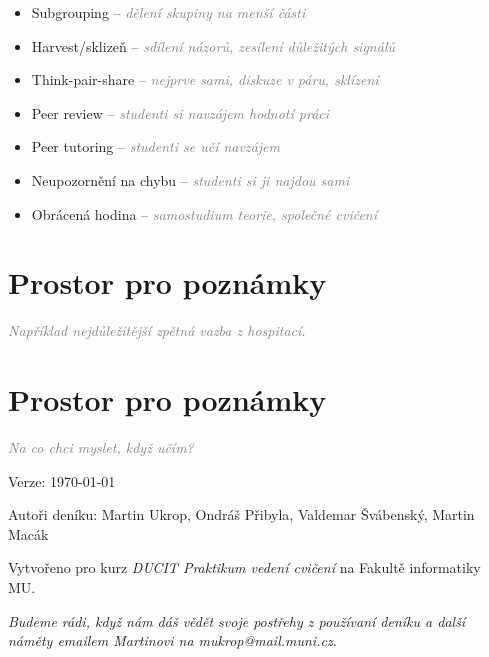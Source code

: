 \documentclass[twoside,openany]{book}
\newcommand{\note}[1]{\textcolor{gray}{\small\itshape #1}}
\begin{document}
\begin{itemize}
\item Subgrouping -- \note{dělení skupiny na menší části}
\item Harvest/sklizeň -- \note{sdílení názorů, zesílení důležitých signálů}
\item Think-pair-share -- \note{nejprve sami, diskuze v páru, sklízení}
\item Peer review -- \note{studenti si navzájem hodnotí práci}
\item Peer tutoring -- \note{studenti se učí navzájem}
\item Neupozornění na chybu -- \note{studenti si ji najdou sami}
\item Obrácená hodina -- \note{samostudium teorie, společné cvičení}
\end{itemize}

\chapter*{Prostor pro poznámky}
\note{Například nejdůležitější zpětná vazba z hospitací.}

\chapter*{Prostor pro poznámky}
\note{Na co chci myslet, když učím?}

\newpage
\vspace*{\fill}
Verze: \today

Autoři deníku: Martin Ukrop, Ondráš Přibyla, Valdemar Švábenský, Martin Macák

Vytvořeno pro kurz \textit{DUCIT Praktikum vedení cvičení} na Fakultě informatiky MU.

\textit{Budeme rádi, když nám dáš vědět svoje postřehy z používaní deníku a další náměty emailem Martinovi na mukrop@mail.muni.cz.}
\end{document}
